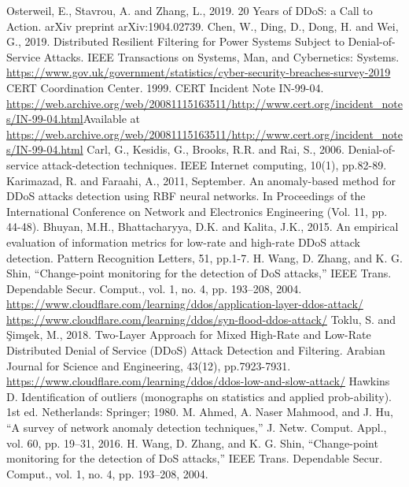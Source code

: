 \documentclass[conference, a4paper]{IEEEtran}
\begin{document}
\begin{thebibliography}{00}
    Osterweil, E., Stavrou, A. and Zhang, L., 2019. 20 Years of DDoS: a Call to Action. arXiv preprint arXiv:1904.02739.
    Chen, W., Ding, D., Dong, H. and Wei, G., 2019. Distributed Resilient Filtering for Power Systems Subject to Denial-of-Service Attacks. IEEE Transactions on Systems, Man, and Cybernetics: Systems.
    \url{https://www.gov.uk/government/statistics/cyber-security-breaches-survey-2019}
    CERT Coordination Center. 1999. CERT Incident Note IN-99-04. \url{https://web.archive.org/web/20081115163511/http://www.cert.org/incident_notes/IN-99-04.html}Available at \url{https://web.archive.org/web/20081115163511/http://www.cert.org/incident_notes/IN-99-04.html}
    Carl, G., Kesidis, G., Brooks, R.R. and Rai, S., 2006. Denial-of-service attack-detection techniques. IEEE Internet computing, 10(1), pp.82-89.
    Karimazad, R. and Faraahi, A., 2011, September. An anomaly-based method for DDoS attacks detection using RBF neural networks. In Proceedings of the International Conference on Network and Electronics Engineering (Vol. 11, pp. 44-48).
    Bhuyan, M.H., Bhattacharyya, D.K. and Kalita, J.K., 2015. An empirical evaluation of information metrics for low-rate and high-rate DDoS attack detection. Pattern Recognition Letters, 51, pp.1-7.
    H. Wang, D. Zhang, and K. G. Shin, “Change-point monitoring for the detection of DoS attacks,” IEEE Trans. Dependable Secur. Comput., vol. 1, no. 4, pp. 193–208, 2004.
    \url{https://www.cloudflare.com/learning/ddos/application-layer-ddos-attack/}
    \url{https://www.cloudflare.com/learning/ddos/syn-flood-ddos-attack/}
    Toklu, S. and Şimşek, M., 2018. Two-Layer Approach for Mixed High-Rate and Low-Rate Distributed Denial of Service (DDoS) Attack Detection and Filtering. Arabian Journal for Science and Engineering, 43(12), pp.7923-7931.
    \url{https://www.cloudflare.com/learning/ddos/ddos-low-and-slow-attack/}
    Hawkins D. Identification of outliers (monographs on statistics and applied prob-ability). 1st ed. Netherlands: Springer; 1980.
    M. Ahmed, A. Naser Mahmood, and J. Hu, “A survey of network anomaly detection techniques,” J. Netw. Comput. Appl., vol. 60, pp. 19–31, 2016.
    H. Wang, D. Zhang, and K. G. Shin, “Change-point monitoring for the detection of DoS attacks,” IEEE Trans. Dependable Secur. Comput., vol. 1, no. 4, pp. 193–208, 2004.

\end{thebibliography}

\vspace{12pt}
\end{document}
